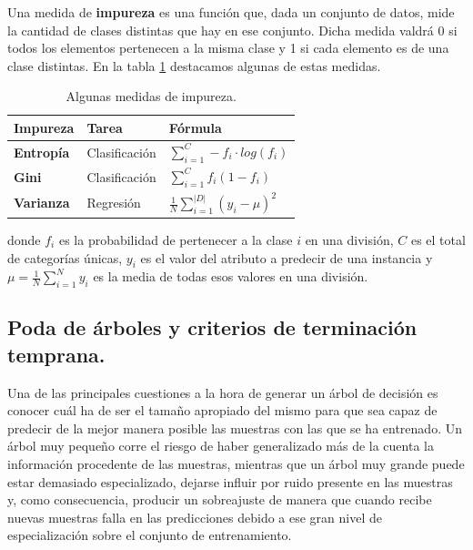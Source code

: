 Una medida de \textbf{impureza} \cite{impurity} es una función que, dada un conjunto de datos, mide la cantidad de clases distintas que hay en ese conjunto. Dicha medida valdrá 0 si todos los elementos pertenecen a la misma clase y 1 si cada elemento es de una clase distintas. En la tabla \ref{tab:entropy} destacamos algunas de estas medidas.\\

\begin{table}[ht]
\centering
\begin{tabular}{|l|l|l|}
\hline
\textbf{Impureza} & \textbf{Tarea} & \textbf{Fórmula}                         \\ \hline
\textbf{Entropía}  & Clasificación  & $\sum_{i=1}^{C}- f_i \cdot log (f_i)$    \\ \hline
\textbf{Gini}      & Clasificación  & $\sum_{i=1}^{C} f_i (1 - f_i)$           \\ \hline
\textbf{Varianza}  & Regresión      & $\frac{1}{N}\sum_{i=1}^|D|(y_i - \mu)^2$ \\ \hline
\end{tabular}
\caption{Algunas medidas de impureza.}
\label{tab:entropy}
\end{table}

donde $f_i$ es la probabilidad de pertenecer a la clase $i$ en una división, $C$ es el total de categorías únicas, $y_i$ es el valor del atributo a predecir de una instancia  y $\mu = \frac{1}{N} \sum_{i=1}^{N}y_i$ es la media de todas esos valores en una división.\\

\subsection{Poda de árboles y criterios de terminación temprana.}
Una de las principales cuestiones a la hora de generar un árbol de decisión es conocer cuál ha de ser el tamaño apropiado del mismo para que sea capaz de predecir de la mejor manera posible las muestras con las que se ha entrenado. Un árbol muy pequeño corre el riesgo de haber generalizado más de la cuenta la información procedente de las muestras, mientras que un árbol muy grande puede estar demasiado especializado, dejarse influir por ruido presente en las muestras y, como consecuencia, producir un sobreajuste de manera que cuando recibe nuevas muestras falla en las predicciones debido a ese gran nivel de especialización sobre el conjunto de entrenamiento. \\

